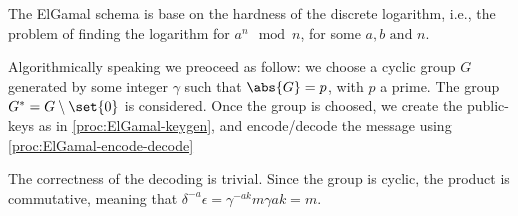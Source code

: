 \documentclass{subfiles}
\begin{document}
    The ElGamal schema is base on the hardness of the discrete logarithm, 
        i.e., the problem of finding the logarithm for \(a^{n} \mod n\),
        for some \(a, b \text{ and } n\).
    
    Algorithmically speaking we preoceed as follow: 
        we choose a cyclic group \(G\) generated by some integer \(\gamma\)
        such that \(\abs{G} = p\), with \(p\) a prime. 
        The group \(G^{*} = G \setminus \set{ 0 }\) is considered.
        Once the group is choosed, we create the public-keys as in \autoref{proc:ElGamal-keygen},
        and encode/decode the message using \autoref{proc:ElGamal-encode-decode}
        
        

    The correctness of the decoding is trivial. Since the group is cyclic, 
        the product is commutative, meaning that \(\delta^{-a}\epsilon = \gamma^{-ak} m \gamma{ak} = m\).
\end{document}
